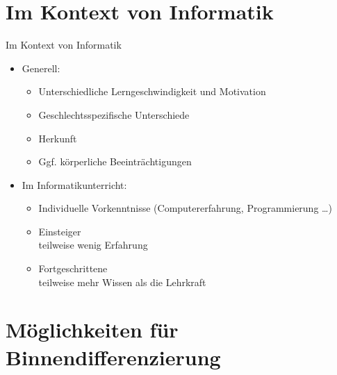\documentclass{beamer}
\newcommand{\ppause}{}
\begin{document}
	\section{Im Kontext von Informatik}
	
	\begin{frame}[t]{Im Kontext von Informatik}
		\begin{itemize}
			\item Generell:
			\ppause
			\begin{itemize}
				\item Unterschiedliche Lerngeschwindigkeit und Motivation
				\ppause
				\item Geschlechtsspezifische Unterschiede
				\ppause
				\item Herkunft
				\ppause
				\item Ggf. körperliche Beeinträchtigungen
				\ppause
			\end{itemize}
			
			\item Im Informatikunterricht:
			\ppause
			\begin{itemize}
				\item Individuelle Vorkenntnisse (Computererfahrung, Programmierung \dots)
				\ppause
				\item Einsteiger\\
				\ppause
				\hspace{.7cm} teilweise wenig Erfahrung
				\ppause
				\item Fortgeschrittene\\
				\ppause
				\hspace{.7cm} teilweise mehr Wissen als die Lehrkraft
			\end{itemize}
		\end{itemize}
	\end{frame}
	
	\section{Möglichkeiten für Binnendifferenzierung}
	
\end{document}
